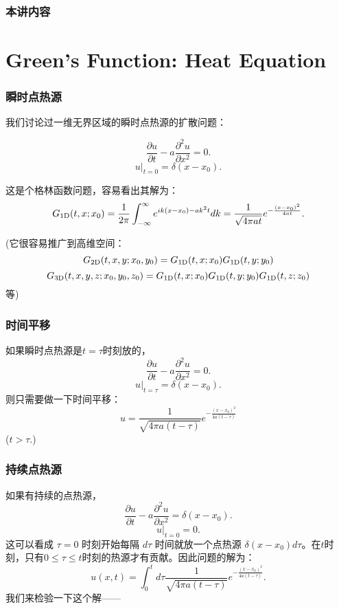 \documentclass[CJK]{beamer}
\date{}
\begin{document}
  \bch
{}

\begin{frame}
\frametitle{本讲内容}

\tableofcontents

\end{frame}

\section{Green's Function: Heat Equation}

\begin{frame}
  \frametitle{瞬时点热源}
  
  我们讨论过一维无界区域的瞬时点热源的扩散问题：
  
  $$\frac{\partial u}{\partial t} - a\frac{\partial^2 u}{\partial x^2}=0.$$
  $$\left. u \right\vert_{t=0}= \delta(x-x_0).$$

  这是个格林函数问题，容易看出其解为：
  $$  G_{\rm 1D}(t, x; x_0) = \frac{1}{2\pi}\int_{-\infty}^\infty e^{ik(x-x_0)-ak^2t}dk = \frac{1}{\sqrt{4\pi at}} e^{-\frac{(x-x_0)^2}{4at}} . $$

  (它很容易推广到高维空间： $$G_{\rm 2D}(t, x,y;x_0,y_0) = G_{\rm 1D}(t, x; x_0)G_{\rm 1D}(t, y; y_0)$$
  $$G_{\rm 3D}(t, x,y,z;x_0,y_0,z_0) = G_{\rm 1D}(t, x; x_0)G_{\rm 1D}(t, y; y_0)G_{\rm 1D}(t, z; z_0)$$
  等)
  
\end{frame}

\begin{frame}
  \frametitle{时间平移}
  如果瞬时点热源是$t=\tau$时刻放的，
  $$\frac{\partial u}{\partial t} - a\frac{\partial^2 u}{\partial x^2}=0.$$
  $$\left. u \right\vert_{t=\tau}= \delta(x-x_0).$$
  则只需要做一下时间平移：
  $$ u  = \frac{1}{\sqrt{4\pi a(t-\tau)}} e^{-\frac{(x-x_0)^2}{4a(t-\tau)}}  $$
  ($t>\tau$.)

\end{frame}


\begin{frame}
  \frametitle{持续点热源}
  如果有持续的点热源，
  $$\frac{\partial u}{\partial t} - a\frac{\partial^2 u}{\partial x^2}=\delta(x-x_0).$$
  $$\left. u \right\vert_{t=0}=0.$$
  这可以看成 $\tau=0$ 时刻开始每隔 $d\tau$ 时间就放一个点热源 $\delta(x-x_0)d\tau$。在$t$时刻，只有$0\le \tau\le t$时刻的热源才有贡献。因此问题的解为：
  $$ u(x,t) = \int_0^t d\tau  \frac{1}{\sqrt{4\pi a(t-\tau)}} e^{-\frac{(x-x_0)^2}{4a(t-\tau)}}.$$
  我们来检验一下这个解——
\end{frame}
\end{document}
